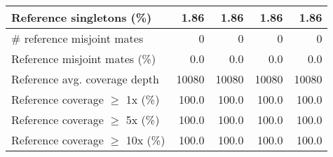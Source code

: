 \documentclass[12pt,a4paper]{article}
\begin{document}
\begin{table}[ht]
\begin{center}
\begin{tabular}{|l*{4}{|r}|}
Reference singletons (\%) & 1.86 & 1.86 & 1.86 & 1.86 \\ \hline
\# reference misjoint mates & 0 & 0 & 0 & 0 \\ \hline
Reference misjoint mates (\%) & 0.0 & 0.0 & 0.0 & 0.0 \\ \hline
Reference avg. coverage depth & 10080 & 10080 & 10080 & 10080 \\ \hline
Reference coverage $\geq$ 1x (\%) & 100.0 & 100.0 & 100.0 & 100.0 \\ \hline
Reference coverage $\geq$ 5x (\%) & 100.0 & 100.0 & 100.0 & 100.0 \\ \hline
Reference coverage $\geq$ 10x (\%) & 100.0 & 100.0 & 100.0 & 100.0 \\ \hline
\end{tabular}
\end{center}
\end{table}
\end{document}
